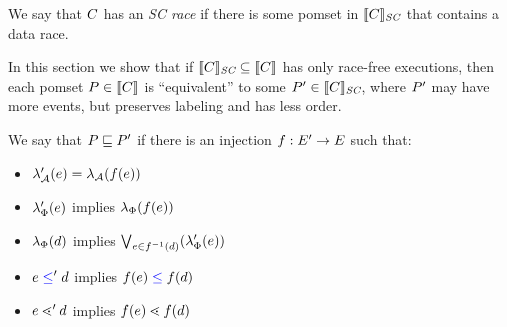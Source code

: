 We say that $C$ has an \emph{SC race} if there is some pomset in $\llbracket C\rrbracket_{\textit{SC}}$
that contains a data race.

In this section we show that if $\llbracket C\rrbracket_{\textit{SC}}\subseteq\llbracket C\rrbracket$ has only
race-free executions, then each pomset $P\in\llbracket C\rrbracket$ is ``equivalent''
to some $P'\in\llbracket C\rrbracket_{\textit{SC}}$, where $P'$ may have more events, but
preserves labeling and has less order.

We say that $P\sqsubseteq P'$ if there is an injection
$f:E'\rightarrow E$ such that:
\begin{itemize}
\item $\lambda_{\mathcal{A}}'(e) = \lambda_{\mathcal{A}}(f(e))$
\item $\lambda_{\Phi}'(e)$ implies $\lambda_{\Phi}(f(e))$
\item $\lambda_{\Phi}(d)$ implies $\bigvee_{e\in f^{-1}(d)}(\lambda_{\Phi}'(e))$
\item $e\mathrel{{\color{blue}\leq}}'d$ implies $f(e)\mathrel{{\color{blue}\leq}}f(d)$
\item $e\lessdot'd$ implies $f(e)\lessdot f(d)$
\end{itemize}

